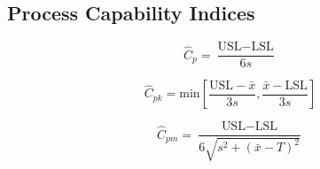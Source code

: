 \documentclass[a4paper,12pt]{article}
\begin{document}
\normalsize{
\subsection*{Process Capability Indices}
\begin{multicols}{2}
\[ \hat{C}_p = \frac{\mbox{USL} - \mbox{LSL}}{6s}\]

\[ \hat{C}_{pk} = \mbox{min} \left[\frac{\mbox{USL} - \bar{x}}{3s},\frac{\bar{x} - \mbox{LSL}}{3s} \right] \]

\[ \hat{C}_{pm} = \frac{\mbox{USL} - \mbox{LSL}}{6\sqrt{s^2+(\bar{x}-T)^2}}\]
\end{multicols}
	\newpage
	
	\Large{
}}
\end{document}
